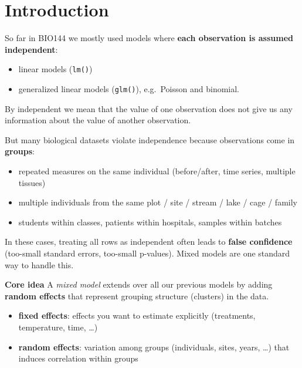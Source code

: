\documentclass[
  letterpaper,
  8pt,
  a4paper]{book}
\providecommand{\tightlist}{%
  \setlength{\itemsep}{0pt}\setlength{\parskip}{0pt}}
\begin{document}
\section*{Introduction}\label{introduction-8}


So far in BIO144 we mostly used models where \textbf{each observation is
assumed independent}:

\begin{itemize}
\tightlist
\item
  linear models (\texttt{lm()})
\item
  generalized linear models (\texttt{glm()}), e.g.~Poisson and binomial.
\end{itemize}

By independent we mean that the value of one observation does not give
us any information about the value of another observation.

But many biological datasets violate independence because observations
come in \textbf{groups}:

\begin{itemize}
\tightlist
\item
  repeated measures on the same individual (before/after, time series,
  multiple tissues)
\item
  multiple individuals from the same plot / site / stream / lake / cage
  / family
\item
  students within classes, patients within hospitals, samples within
  batches
\end{itemize}

In these cases, treating all rows as independent often leads to
\textbf{false confidence} (too-small standard errors, too-small
p-values). Mixed models are one standard way to handle this.

\begin{tcolorbox}[enhanced jigsaw, arc=.35mm, bottomrule=.15mm, bottomtitle=1mm, breakable, colback=white, colbacktitle=quarto-callout-important-color!10!white, colframe=quarto-callout-important-color-frame, coltitle=black, left=2mm, leftrule=.75mm, opacityback=0, opacitybacktitle=0.6, rightrule=.15mm, title=\textcolor{quarto-callout-important-color}{\faExclamation}\hspace{0.5em}{Important}, titlerule=0mm, toprule=.15mm, toptitle=1mm]

\textbf{Core idea} A \emph{mixed model} extends over all our previous
models by adding \textbf{random effects} that represent grouping
structure (clusters) in the data.

\begin{itemize}
\tightlist
\item
  \textbf{fixed effects}: effects you want to estimate explicitly
  (treatments, temperature, time, \ldots)
\item
  \textbf{random effects}: variation among groups (individuals, sites,
  years, \ldots) that induces correlation within groups
\end{itemize}

\end{tcolorbox}
\end{document}
